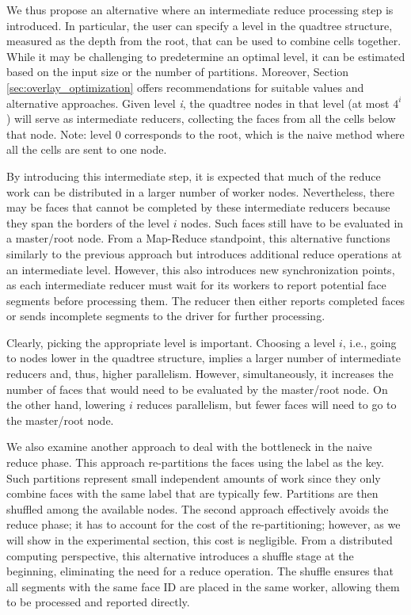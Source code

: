 We thus propose an alternative where an intermediate reduce processing step is introduced. In particular, the user can specify a level in the quadtree structure, measured as the depth from the root, that can be used to combine cells together.  While it may be challenging to predetermine an optimal level, it can be estimated based on the input size or the number of partitions. Moreover, Section \ref{sec:overlay_optimization} offers recommendations for suitable values and alternative approaches.  Given level \textit{i}, the quadtree nodes in that level (at most $4^i$) will serve as intermediate reducers, collecting the faces from all the cells below that node. Note: level 0 corresponds to the root, which is the naive method where all the cells are sent to one node.

By introducing this intermediate step, it is expected that much of the reduce work can be distributed in a larger number of worker nodes. Nevertheless, there may be faces that cannot be completed by these intermediate reducers because they span the borders of the level $i$ nodes. Such faces still have to be evaluated in a master/root node.  From a Map-Reduce standpoint, this alternative functions similarly to the previous approach but introduces additional reduce operations at an intermediate level. However, this also introduces new synchronization points, as each intermediate reducer must wait for its workers to report potential face segments before processing them. The reducer then either reports completed faces or sends incomplete segments to the driver for further processing.

Clearly, picking the appropriate level is important. Choosing a level $i$, i.e., going to nodes lower in the quadtree structure, implies a larger number of intermediate reducers and, thus, higher parallelism. However, simultaneously, it increases the number of faces that would need to be evaluated by the master/root node. On the other hand, lowering $i$ reduces parallelism, but fewer faces will need to go to the master/root node.

We also examine another approach to deal with the bottleneck in the naive reduce phase. This approach re-partitions the faces using the label as the key. Such partitions represent small independent amounts of work since they only combine faces with the same label that are typically few. Partitions are then shuffled among the available nodes. The second approach effectively avoids the reduce phase; it has to account for the cost of the re-partitioning; however, as we will show in the experimental section, this cost is negligible.  From a distributed computing perspective, this alternative introduces a shuffle stage at the beginning, eliminating the need for a reduce operation. The shuffle ensures that all segments with the same face ID are placed in the same worker, allowing them to be processed and reported directly.


